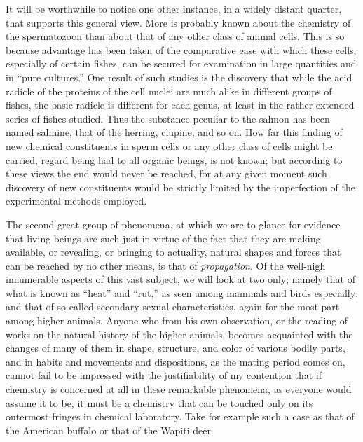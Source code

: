 \documentclass[a4paper, 11pt, oneside, polutonikogreek, english]{article}
\begin{document}
It will be worthwhile to notice one other instance, in a widely distant quarter, that supports this general view. More is probably known about the chemistry of the spermatozoon than about that of any other class of animal cells. This is so because advantage has been taken of the comparative ease with which these cells, especially of certain fishes, can be secured for examination in large quantities and in ``pure cultures.'' One result of such studies is the discovery that while the acid radicle of the proteins of the cell nuclei are much alike in different groups of fishes, the basic radicle is different for each genus, at least in the rather extended series of fishes studied. Thus the substance peculiar to the salmon has been named salmine, that of the herring, clupine, and so on. How far this finding of new chemical constituents in sperm cells or any other class of cells might be carried, regard being had to all organic beings, is not known; but according to these views the end would never be reached, for at any given moment such discovery of new constituents would be strictly limited by the imperfection of the experimental methods employed.

The second great group of phenomena, at which we are to glance for evidence that living beings are such just in virtue of the fact that they are making available, or revealing, or bringing to actuality, natural shapes and forces that can be reached by no other means, is that of \emph{propagation}. Of the well-nigh innumerable aspects of this vast subject, we will look at two only; namely that of what is known as ``heat'' and ``rut,'' as seen among mammals and birds especially; and that of so-called secondary sexual characteristics, again for the most part among higher animals. Anyone who from his own observation, or the reading of works on the natural history of the higher animals, becomes acquainted with the changes of many of them in shape, structure, and color of various bodily parts, and in habits and movements and dispositions, as the mating period comes on, cannot fail to be impressed with the justifiability of my contention that if chemistry is concerned at all in these remarkable phenomena, as everyone would assume it to be, it must be a chemistry that can be touched only on its outermost fringes in chemical laboratory. Take for example such a case as that of the American buffalo or that of the Wapiti deer.
\end{document}
